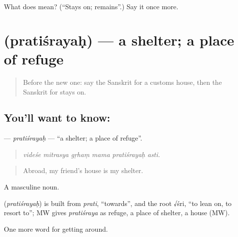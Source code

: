 \begin{tcolorbox}[breakable,colback=teal!4,colframe=teal!35!black,title={Before you move on}]
What does  mean? (\textquotedblleft{}Stays on; remains\textquotedblright{}.) Say it once more.
\end{tcolorbox}
\section[\texorpdfstring{\sk{प्रतिश्रयः} (pratiśrayaḥ)}{प्रतिश्रयः (pratiśrayaḥ)}]{ (pratiśrayaḥ) — a shelter; a place of refuge}

\label{lesson:SA-C426-pratisrayah}



\begin{quote}
Before the new one: say the Sanskrit for a customs house, then the Sanskrit for stays on.
\end{quote}

\subsection*{You'll want to know: }
\textbf{} — \emph{pratiśrayaḥ} — \textquotedblleft{}a shelter; a place of refuge\textquotedblright{}.

\begin{quote}
     
\end{quote}

\begin{quote}
\emph{videśe mitrasya gṛhaṃ mama pratiśrayaḥ asti.}
\end{quote}

\begin{quote}
Abroad, my friend's house is my shelter.
\end{quote}

A masculine noun.

\begin{cousinweb}
\textbf{} (\emph{pratiśrayaḥ}) is built from \emph{prati}, \textquotedblleft{}towards\textquotedblright{}, and the root √śri, \textquotedblleft{}to lean on, to resort to\textquotedblright{}; MW gives \emph{pratiśraya} as refuge, a place of shelter, a house (MW).
\end{cousinweb}

\begin{grammarlens}[title={What you've built}]
One more word for getting around.
\end{grammarlens}

